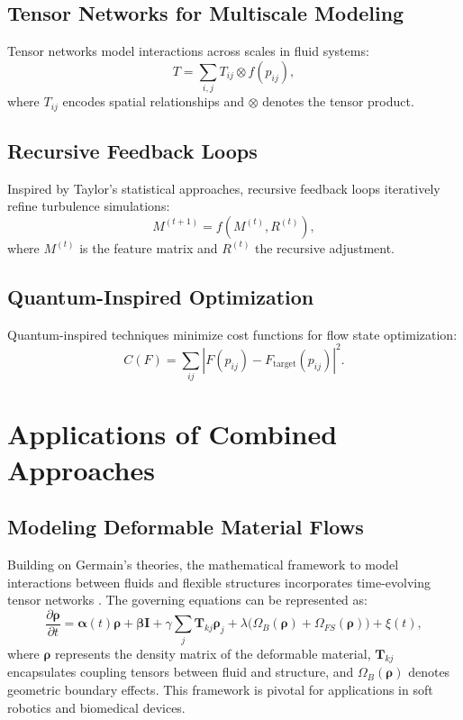 \documentclass{article}
\theoremstyle{plain}
\begin{document}
\subsection{Tensor Networks for Multiscale Modeling}
Tensor networks model interactions across scales in fluid systems:
\begin{equation}
T = \sum_{i,j} T_{ij} \otimes f(p_{ij}),
\end{equation}
where $T_{ij}$ encodes spatial relationships and $\otimes$ denotes the tensor product.

\subsection{Recursive Feedback Loops}
Inspired by Taylor's statistical approaches, recursive feedback loops iteratively refine turbulence simulations:
\begin{equation}
M^{(t+1)} = f(M^{(t)}, R^{(t)}),
\end{equation}
where $M^{(t)}$ is the feature matrix and $R^{(t)}$ the recursive adjustment.

\subsection{Quantum-Inspired Optimization}
Quantum-inspired techniques minimize cost functions for flow state optimization:
\begin{equation}
C(F) = \sum_{ij} |F(p_{ij}) - F_{\text{target}}(p_{ij})|^2.
\end{equation}

\section{Applications of Combined Approaches}
\subsection{Modeling Deformable Material Flows}
Building on Germain's theories, the mathematical framework to model interactions between fluids and flexible structures incorporates time-evolving tensor networks \cite{germain1981continuum}. The governing equations can be represented as:
\begin{equation}
\frac{\partial \bm{\rho}}{\partial t} = \bm{\alpha}(t) \bm{\rho} + \bm{\beta} \bm{I} + \gamma \sum_{j} \bm{T}_{kj} \bm{\rho}_j + \lambda \Big( \Omega_B(\bm{\rho}) + \Omega_{FS}(\bm{\rho}) \Big) + \xi(t),
\end{equation}
where $\bm{\rho}$ represents the density matrix of the deformable material, $\bm{T}_{kj}$ encapsulates coupling tensors between fluid and structure, and $\Omega_B(\bm{\rho})$ denotes geometric boundary effects. This framework is pivotal for applications in soft robotics and biomedical devices.
\end{document}
